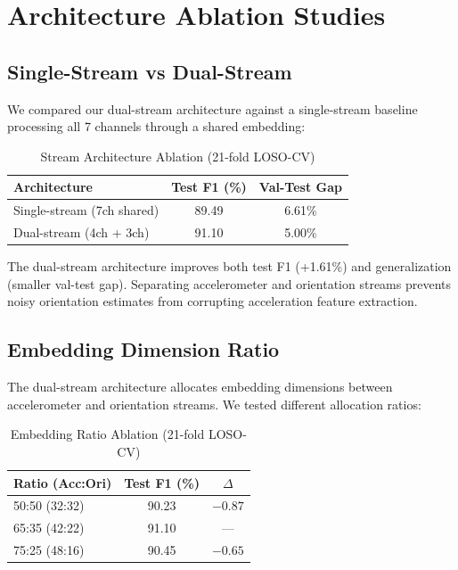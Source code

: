 \section{Architecture Ablation Studies}
\label{sec:arch_ablation}

\subsection{Single-Stream vs Dual-Stream}

We compared our dual-stream architecture against a single-stream baseline processing all 7 channels through a shared embedding:

\begin{table}[htbp]
\centering
\caption{Stream Architecture Ablation (21-fold LOSO-CV)}
\label{tab:stream_ablation}
\begin{tabular}{@{}lcc@{}}
\toprule
\textbf{Architecture} & \textbf{Test F1 (\%)} & \textbf{Val-Test Gap} \\
\midrule
Single-stream (7ch shared) & 89.49 & 6.61\% \\
Dual-stream (4ch + 3ch) & 91.10 & 5.00\% \\
\bottomrule
\end{tabular}
\end{table}

The dual-stream architecture improves both test F1 (+1.61\%) and generalization (smaller val-test gap). Separating accelerometer and orientation streams prevents noisy orientation estimates from corrupting acceleration feature extraction.

\subsection{Embedding Dimension Ratio}

The dual-stream architecture allocates embedding dimensions between accelerometer and orientation streams. We tested different allocation ratios:

\begin{table}[htbp]
\centering
\caption{Embedding Ratio Ablation (21-fold LOSO-CV)}
\label{tab:ratio_ablation}
\begin{tabular}{@{}lcc@{}}
\toprule
\textbf{Ratio (Acc:Ori)} & \textbf{Test F1 (\%)} & \textbf{$\Delta$} \\
\midrule
50:50 (32:32) & 90.23 & $-0.87$ \\
65:35 (42:22) & 91.10 & --- \\
75:25 (48:16) & 90.45 & $-0.65$ \\
\bottomrule
\end{tabular}
\end{table}

